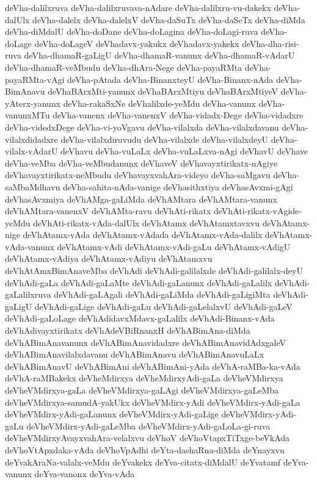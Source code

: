{deVha-dalilxruva
deVha-dalilxruvava-nAdare
deVha-dalilxru-vu-dakekx
deVha-dalUlx
deVha-dalelx
deVha-dalelxV
deVha-daSuTx
deVha-daSeTx
deVha-diMda
deVha-diMdalU
deVha-doDane
deVha-doLagina
deVha-doLagi-ruva
deVha-doLage
deVha-doLageV
deVhadavx-yakukx
deVhadavx-yakekx
deVha-dha-risi-ruva
deVha-dhamaR-gaLigU
deVha-dhamaR-vanunx
deVha-dhamaR-vAdarU
deVha-dhamaR-veMbudu
deVha-dhAra-Nege
deVha-payaRMta
deVha-payaRMta-vAgi
deVha-pAtada
deVha-BinanxteyU
deVha-Binanx-nAda
deVha-BimAnavu
deVhaBArxMti-yanunx
deVhaBArxMtiyu
deVhaBArxMtiyeV
deVha-yAterx-yanunx
deVha-rakaSxNe
deVhalilxde-yeMdu
deVha-vanunx
deVha-vanunxMTu
deVha-vanenx
deVha-vanenxV
deVha-vidadx-Dege
deVha-vidadxre
deVha-videdxDege
deVha-vi-yoVgavu
deVha-vilalxda
deVha-vilalxdavanu
deVha-vilalxdidadxre
deVha-vilalxdiruvudu
deVha-vilalxde
deVha-vilalxdeyU
deVha-vilalx-vAdarU
deVhavu
deVha-vuLaLx
deVha-vuLaLxva-nAgi
deVhavU
deVhave
deVha-veMba
deVha-veMbudanunx
deVhaveV
deVhavayxtirikatx-nAgiye
deVhavayxtirikatx-neMbudu
deVhavayxvahAra-videyo
deVha-saMgavu
deVha-saMbaMdhavu
deVha-sahita-nAda-vanige
deVhasithxtiya
deVhasAvxmi-gAgi
deVhasAvxmiya
deVhAMga-gaLiMda
deVhAMtara
deVhAMtara-vanunx
deVhAMtara-vanenxV
deVhAMta-ravu
deVhAti-rikatx
deVhAti-rikatx-vAgide-yeMdu
deVhAti-rikatx-vAda-dalUlx
deVhAtamx
deVhAtamxtavxvu
deVhAtamx-nige
deVhAtamx-vAda
deVhAtamx-vAdada
deVhAtamx-vAda-dalilx
deVhAtamx-vAda-vanunx
deVhAtamx-vAdi
deVhAtamx-vAdi-gaLu
deVhAtamx-vAdigU
deVhAtamx-vAdiya
deVhAtamx-vAdiyu
deVhAtamxvu
deVhAtAmxBimAnaveMba
deVhAdi
deVhAdi-galilalxde
deVhAdi-galilalx-deyU
deVhAdi-gaLa
deVhAdi-gaLaMte
deVhAdi-gaLanunx
deVhAdi-gaLalilx
deVhAdi-gaLalilxruva
deVhAdi-gaLAgali
deVhAdi-gaLiMda
deVhAdi-gaLigiMta
deVhAdi-gaLigU
deVhAdi-gaLige
deVhAdi-gaLu
deVhAdi-gaLelalxvU
deVhAdi-gaLeV
deVhAdi-gaLoLage
deVhAdidavxMdavx-gaLalilx
deVhAdi-Binanx-vAda
deVhAdivayxtirikatx
deVhAdeVBiRnanxH
deVhABimAna-diMda
deVhABimAnavanunx
deVhABimAnavidadxre
deVhABimAnavidAdxgaleV
deVhABimAnavilalxdavanu
deVhABimAnavu
deVhABimAnavuLaLx
deVhABimAnavU
deVhABimAni
deVhABimAni-yAda
deVhA-raMBa-ka-vAda
deVhA-raMBakekx
deVheMdirxya
deVheMdirxyAdi-gaLa
deVheVMdirxya
deVheVMdirxya-gaLa
deVheVMdirxya-gaLAgi
deVheVMdirxya-gaLeMba
deVheVMdirxya-samudA-yakUkx
deVheVMdirx-yAdi
deVheVMdirx-yAdi-gaLa
deVheVMdirx-yAdi-gaLanunx
deVheVMdirx-yAdi-gaLige
deVheVMdirx-yAdi-gaLu
deVheVMdirx-yAdi-gaLeMba
deVheVMdirx-yAdi-gaLoLa-gi-ruva
deVheVMdirxyAvayxvahAra-velalxvu
deVhoV
deVhoVtapxTiTxge-beVkAda
deVhoVtApxdaka-vAda
deVhoVpAdhi
deYta-dashaRna-diMda
deYnayxvu
deYvakAraNa-valalx-veMdu
deYvakekx
deYva-citatx-diMdalU
deYvatamf
deYva-vanunx
deYva-vanonx
deYva-vAda
}
